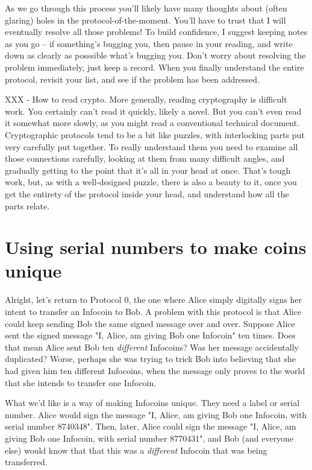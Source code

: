 \documentclass[12pt]{book}
\newcounter{problem}[chapter]
\begin{document}
As we go through this process you'll likely have many thoughts about
(often glaring) holes in the protocol-of-the-moment.  You'll have to
trust that I will eventually resolve all those problems!  To build
confidence, I suggest keeping notes as you go -- if something's
bugging you, then pause in your reading, and write down as clearly as
posssible what's bugging you.  Don't worry about resolving the problem
immediately, just keep a record.  When you finally understand the
entire protocol, revisit your list, and see if the problem has been
addressed.

XXX - How to read crypto.  More generally, reading cryptography is
difficult work.  You certainly can't read it quickly, likely a novel.
But you can't even read it somewhat more slowly, as you might read a
conventional technical document.  Cryptographic protocols tend to be a
bit like puzzles, with interlocking parts put very carefully put
together.  To really understand them you need to examine all those
connections carefully, looking at them from many difficult angles, and
gradually getting to the point that it's all in your head at once.
That's tough work, but, as with a well-designed puzzle, there is also
a beauty to it, once you get the entirety of the protocol inside your
head, and understand how all the parts relate.

\section{Using serial numbers to make coins unique}

Alright, let's return to Protocol 0, the one where Alice simply
digitally signs her intent to transfer an Infocoin to Bob.  A problem
with this protocol is that Alice could keep sending Bob the same
signed message over and over.  Suppose Alice sent the signed message
"I, Alice, am giving Bob one Infocoin" ten times.  Does that mean
Alice sent Bob ten \emph{different} Infocoins?  Was her message
accidentally duplicated?  Worse, perhaps she was trying to trick Bob
into believing that she had given him ten different Infocoins, when
the message only proves to the world that she intends to transfer one
Infocoin.

What we'd like is a way of making Infocoins unique.  They need a label
or serial number.  Alice would sign the message "I, Alice, am giving
Bob one Infocoin, with serial number 8740348".  Then, later, Alice
could sign the message "I, Alice, am giving Bob one Infocoin, with
serial number 8770431", and Bob (and everyone else) would know that
that this was a \emph{different} Infocoin that was being transferred.
\end{document}
